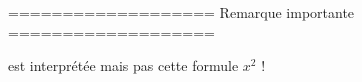 \begin{pseudoverb}[]
===================
Remarque importante
===================

\squaremacro{} est interprétée mais pas
cette formule $x^2$ !
\end{pseudoverb} 
